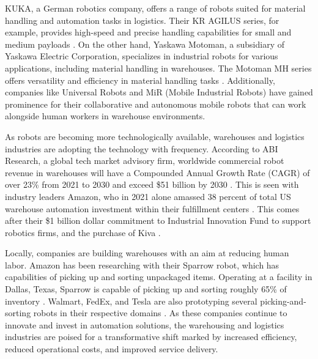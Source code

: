 KUKA, a German robotics company, offers a range of robots suited for material handling and automation tasks in logistics. Their KR AGILUS series, for example, provides high-speed and precise handling capabilities for small and medium payloads \cite{muftooh20186}. On the other hand, Yaskawa Motoman, a subsidiary of Yaskawa Electric Corporation, specializes in industrial robots for various applications, including material handling in warehouses. The Motoman MH series offers versatility and efficiency in material handling tasks \cite{muftooh20186}. Additionally, companies like Universal Robots and MiR (Mobile Industrial Robots) have gained prominence for their collaborative and autonomous mobile robots that can work alongside human workers in warehouse environments. 

As robots are becoming more technologically available, warehouses and logistics industries are adopting the technology with frequency. According to ABI Research, a global tech market advisory firm, worldwide commercial robot revenue in warehouses will have a Compounded Annual Growth Rate (CAGR) of over 23\% from 2021 to 2030 and exceed \$51 billion by 2030 \cite{nytimesRobotsArent}. This is seen with industry leaders Amazon, who in 2021 alone amassed 38 percent of total US warehouse automation investment within their fulfillment centers \cite{interactanalysisWillAmazons}. This comes after their \$1 billion dollar commitment to Industrial Innovation Fund to support robotics firms, and the purchase of Kiva \cite{interactanalysisWillAmazons}.

Locally, companies are building warehouses with an aim at reducing human labor. Amazon has been researching with their Sparrow robot, which has capabilities of picking up and sorting unpackaged items. Operating at a facility in Dallas, Texas, Sparrow is capable of picking up and sorting roughly 65\% of inventory \cite{dallasnewsBattleHumans}. Walmart, FedEx, and Tesla are also prototyping several picking-and-sorting robots in their respective domains \cite{dallasnewsBattleHumans}. As these companies continue to innovate and invest in automation solutions, the warehousing and logistics industries are poised for a transformative shift marked by increased efficiency, reduced operational costs, and improved service delivery.